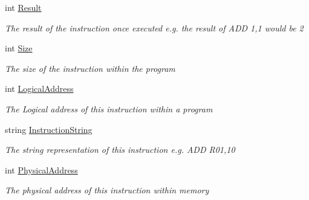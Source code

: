 \begin{DoxyCompactItemize}
int \hyperlink{class_c_p_u___o_s___simulator_1_1_c_p_u_1_1_instruction_a8e0f7c63850af7cfd8a41c066c01838e}{Result}
\begin{DoxyCompactList}\small\item\em The result of the instruction once executed e.\+g. the result of A\+D\+D 1,1 would be 2 \end{DoxyCompactList}\item 
int \hyperlink{class_c_p_u___o_s___simulator_1_1_c_p_u_1_1_instruction_a7c60418808e7bd6cb1964a227dcd9dac}{Size}
\begin{DoxyCompactList}\small\item\em The size of the instruction within the program \end{DoxyCompactList}\item 
int \hyperlink{class_c_p_u___o_s___simulator_1_1_c_p_u_1_1_instruction_abfc23dbc9a978d2a1468b819f87a7614}{Logical\+Address}
\begin{DoxyCompactList}\small\item\em The Logical address of this instruction within a program \end{DoxyCompactList}\item 
string \hyperlink{class_c_p_u___o_s___simulator_1_1_c_p_u_1_1_instruction_a2750b111d827f6e6a8fccd0e8520de89}{Instruction\+String}
\begin{DoxyCompactList}\small\item\em The string representation of this instruction e.\+g. A\+D\+D R01,10 \end{DoxyCompactList}\item 
int \hyperlink{class_c_p_u___o_s___simulator_1_1_c_p_u_1_1_instruction_a97b20c8a0a7536bdddd8e791605a8bac}{Physical\+Address}
\begin{DoxyCompactList}\small\item\em The physical address of this instruction within memory \end{DoxyCompactList}\end{DoxyCompactItemize}
